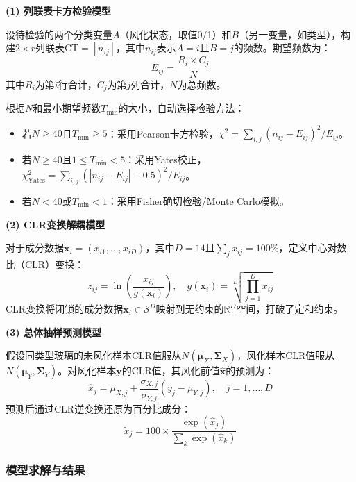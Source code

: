 \documentclass[12pt,a4paper]{ctexart}
\begin{document}
\textbf{(1) 列联表卡方检验模型}

设待检验的两个分类变量$A$（风化状态，取值0/1）和$B$（另一变量，如类型），构建$2\times r$列联表CT$=[n_{ij}]$，其中$n_{ij}$表示$A=i$且$B=j$的频数。期望频数为：
\begin{equation}
    E_{ij} = \frac{R_i \times C_j}{N}
    \label{eq:expected}
\end{equation}
其中$R_i$为第$i$行合计，$C_j$为第$j$列合计，$N$为总频数。

根据$N$和最小期望频数$T_{\min}$的大小，自动选择检验方法\cite{5}：
\begin{itemize}
    \item 若$N \ge 40$且$T_{\min} \ge 5$：采用Pearson卡方检验，$\chi^2=\sum_{i,j}(n_{ij}-E_{ij})^2/E_{ij}$。
    \item 若$N \ge 40$且$1 \le T_{\min}<5$：采用Yates校正，$\chi^2_{\text{Yates}}=\sum_{i,j}(|n_{ij}-E_{ij}|-0.5)^2/E_{ij}$。
    \item 若$N<40$或$T_{\min}<1$：采用Fisher确切检验/Monte Carlo模拟。
\end{itemize}

\textbf{(2) CLR变换解耦模型}

对于成分数据$\mathbf{x}_i=(x_{i1},\ldots,x_{iD})$，其中$D=14$且$\sum_j x_{ij}=100\%$，定义中心对数比（CLR）变换：
\begin{equation}
    z_{ij} = \ln\left(\frac{x_{ij}}{g(\mathbf{x}_i)}\right),\quad g(\mathbf{x}_i)=\sqrt[D]{\prod_{j=1}^{D}x_{ij}}
    \label{eq:clr}
\end{equation}
CLR变换将闭锁的成分数据$\mathbf{x}_i\in\mathscr{S}^D$映射到无约束的$\mathbb{R}^D$空间，打破了定和约束\cite{2}。

\textbf{(3) 总体抽样预测模型}

假设同类型玻璃的未风化样本CLR值服从$N(\boldsymbol{\mu}_X,\boldsymbol{\Sigma}_X)$，风化样本CLR值服从$N(\boldsymbol{\mu}_Y,\boldsymbol{\Sigma}_Y)$。对风化样本$\mathbf{y}$的CLR值，其风化前值$\hat{\mathbf{x}}$的预测为：
\begin{equation}
    \hat{x}_j = \mu_{X,j} + \frac{\sigma_{X,j}}{\sigma_{Y,j}}(y_j - \mu_{Y,j}),\quad j=1,\ldots,D
    \label{eq:pred}
\end{equation}
预测后通过CLR逆变换还原为百分比成分：
\begin{equation}
    \tilde{x}_j = 100\times\frac{\exp(\hat{x}_j)}{\sum_{k}\exp(\hat{x}_k)}
    \label{eq:inverse_clr}
\end{equation}

\subsubsection{模型求解与结果}
\end{document}
